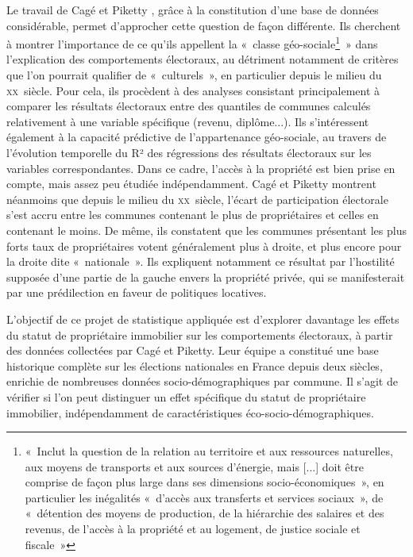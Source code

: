\documentclass[a4paper,14pt]{article}
\begin{document}
\begin{multicols}{2}
Le travail de Cagé et Piketty \parencite{cage_histoire_2023}, grâce à la constitution d'une base de données considérable, permet d'approcher cette question de façon différente. Ils cherchent à montrer l'importance de ce qu'ils appellent la «~classe géo-sociale\footnote{«~Inclut la question de la relation au territoire et aux ressources naturelles, aux moyens de transports et aux sources d'énergie, mais [...] doit être comprise de façon plus large dans ses dimensions socio-économiques~», en particulier les inégalités «~d'accès aux transferts et services sociaux~», de «~détention des moyens de production, de la hiérarchie des salaires et des revenus, de l'accès à la propriété et au logement, de justice sociale et fiscale~»}~» dans l'explication des comportements électoraux, au détriment notamment de critères que l'on pourrait qualifier de «~culturels~», en particulier depuis le milieu du \textsc{xx}\ieme ~siècle. 
Pour cela, ils procèdent à des analyses consistant principalement à comparer les résultats électoraux entre des quantiles de communes calculés relativement à une variable spécifique (revenu, diplôme...). Ils s'intéressent également à la capacité prédictive de l'appartenance géo-sociale, au travers de l'évolution temporelle du R² des régressions des résultats électoraux sur les variables correspondantes.
Dans ce cadre, l'accès à la propriété est bien prise en compte, mais assez peu étudiée indépendamment. Cagé et Piketty montrent néanmoins que depuis le milieu du \textsc{xx}\ieme ~siècle, l'écart de participation électorale s'est accru entre les communes contenant le plus de propriétaires et celles en contenant le moins. De même, ils constatent que les communes présentant les plus forts taux de propriétaires votent généralement plus à droite, et plus encore pour la droite dite «~nationale~». Ils expliquent notamment ce résultat par l'hostilité supposée d'une partie de la gauche envers la propriété privée, qui se manifesterait par une prédilection en faveur de politiques locatives.
\newline

L'objectif de ce projet de statistique appliquée est d'explorer davantage les effets du statut de propriétaire immobilier sur les comportements électoraux, à partir des données collectées par Cagé et Piketty. Leur équipe a constitué une base historique complète sur les élections nationales en France depuis deux siècles, enrichie de nombreuses données socio-démographiques par commune. Il s'agit de vérifier si l'on peut distinguer un effet spécifique du statut de propriétaire immobilier, indépendamment de caractéristiques éco-socio-démographiques.




\end{multicols}
\end{document}

